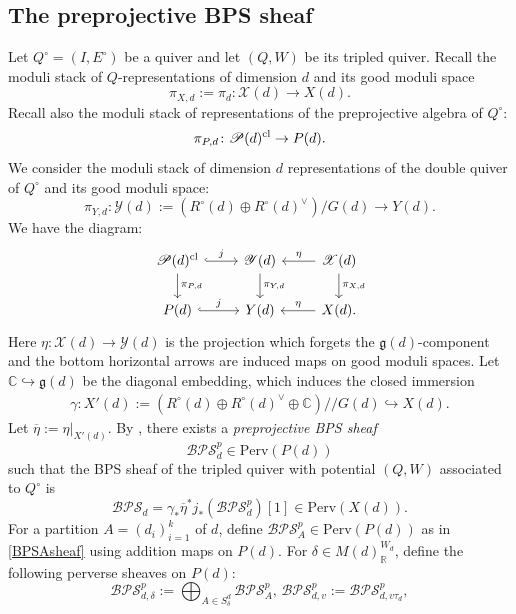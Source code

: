 \documentclass [11pt,oneside,a4paper,mathscr]{amsart}
\theoremstyle{definition}
\newcommand{\X}{\mathscr{X}}
\newcommand{\ssslash}{/\!\!/}
\begin{document}
\subsection{The preprojective BPS sheaf}\label{subsec71}
Let $Q^\circ=(I, E^\circ)$ be a quiver
and let $(Q, W)$ be its tripled quiver. 
Recall the moduli stack of $Q$-representations of 
dimension $d$ and its good moduli space
\[\pi_{X,d}:=\pi_d\colon \X(d)\to X(d).\]
Recall also the moduli stack of representations 
of the preprojective algebra of $Q^{\circ}$:
\[\pi_{P,d}\colon \mathscr{P}(d)^{\rm{cl}}\to P(d).\]
We consider the moduli stack of dimension $d$ representations of the double quiver of $Q^\circ$ and its good moduli space:
\[\pi_{Y, d} \colon \mathscr{Y}(d):=(R^\circ(d)\oplus R^\circ(d)^\vee)/G(d) \to Y(d).\]
We have the diagram:
\begin{equation*}
    \begin{tikzcd}
        \mathscr{P}(d)^\mathrm{cl}
        \arrow[d, "\pi_{P,d}"]\arrow[r, hook, "j"]& \mathscr{Y}(d)
        \arrow[d, "\pi_{Y,d}"]&\mathscr{X}(d)\arrow[l, "\eta"']\arrow[d, "\pi_{X,d}"]\\
        P(d) \arrow[r, hook, "j"]& Y(d)& X(d).\arrow[l, "\eta"']
    \end{tikzcd}
\end{equation*} 
Here $\eta \colon \X(d) \to \mathscr{Y}(d)$ is the projection which forgets the $\mathfrak{g}(d)$-component and the bottom horizontal 
arrows are induced maps on good moduli spaces. 
Let $\mathbb{C} \hookrightarrow \mathfrak{g}(d)$
be the diagonal embedding, which induces the closed immersion 
\begin{align*}
\gamma \colon  X'(d) :=(R^{\circ}(d) \oplus R^{\circ}(d)^{\vee} \oplus \mathbb{C})\ssslash G(d) \hookrightarrow 
X(d). 
\end{align*}
Let $\overline{\eta}:=\eta|_{X'(d)}$. 
By \cite[Theorem/Definition 4.1]{D}, there exists a \textit{preprojective BPS sheaf} 
\[\mathcal{BPS}^p_d\in \mathrm{Perv}(P(d))\]  such that the BPS sheaf of the tripled quiver with potential $(Q,W)$ associated to $Q^\circ$ is 
\begin{equation}\label{etai}
\mathcal{BPS}_d=\gamma_{\ast}\overline{\eta}^{\ast}j_*(\mathcal{BPS}^p_d)[1]\in\mathrm{Perv}(X(d)).
\end{equation}
For a partition $A=(d_i)_{i=1}^k$ of $d$, define $\mathcal{BPS}^p_A\in \mathrm{Perv}(P(d))$ as in \eqref{BPSAsheaf}
using addition maps on $P(d)$. 
For $\delta\in M(d)^{W_d}_\mathbb{R}$,
define the following perverse sheaves on $P(d)$:
\begin{equation}\label{defpreprojbps}
\mathcal{BPS}^p_{d, \delta}:=\bigoplus_{A\in S^d_\delta}\mathcal{BPS}^p_A,\, \mathcal{BPS}^p_{d,v}:=\mathcal{BPS}^p_{d, v\tau_d},
\end{equation}
\end{document}
